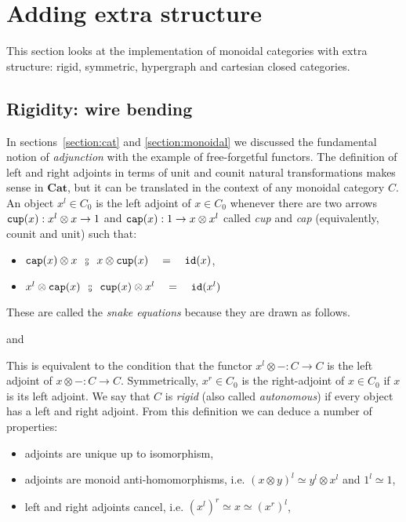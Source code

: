 
\section{Adding extra structure} \label{section:extra structure}

This section looks at the implementation of monoidal categories with extra structure: rigid, symmetric, hypergraph and cartesian closed categories.

\subsection{Rigidity: wire bending} \label{subsection:rigid}

In sections~\ref{section:cat} and \ref{section:monoidal} we discussed the fundamental notion of \emph{adjunction} with the example of free-forgetful functors.
The definition of left and right adjoints in terms of unit and counit natural transformations makes sense in $\mathbf{Cat}$, but it can be translated in the context of any monoidal category $C$.
An object $x^l \in C_0$ is the left adjoint of $x \in C_0$ whenever there are two arrows $\mathtt{cup}(x) : x^l \otimes x \to 1$ and $\mathtt{cap}(x) : 1 \to x \otimes x^l$ called \emph{cup} and \emph{cap} (equivalently, counit and unit) such that:
\begin{itemize}
\item $\ttcap(x) \otimes x \s \fcmp \s x \otimes \ttcup(x) \quad = \quad \id(x)$,
\item $x^l \otimes \ttcap(x) \s \fcmp \s \ttcup(x) \otimes x^l \quad = \quad \id(x^l)$
\end{itemize}
These are called the \emph{snake equations} because they are drawn as follows.
\begin{center}
\hspace{10pt} and \hspace{10pt}
\end{center}
This is equivalent to the condition that the functor $x^l \otimes - : C \to C$ is the left adjoint of $x \otimes - : C \to C$.
Symmetrically, $x^r \in C_0$ is the right-adjoint of $x \in C_0$ if $x$ is its left adjoint.
We say that $C$ is \emph{rigid} (also called \emph{autonomous}) if every object has a left and right adjoint.
From this definition we can deduce a number of properties:
\begin{itemize}
    \item adjoints are unique up to isomorphism,
    \item adjoints are monoid anti-homomorphisms, i.e. $(x \otimes y)^l \simeq y^l \otimes x^l$ and $1^l \simeq 1$,
    \item left and right adjoints cancel, i.e. $(x^l)^r \simeq x \simeq (x^r)^l$,
\end{itemize}
